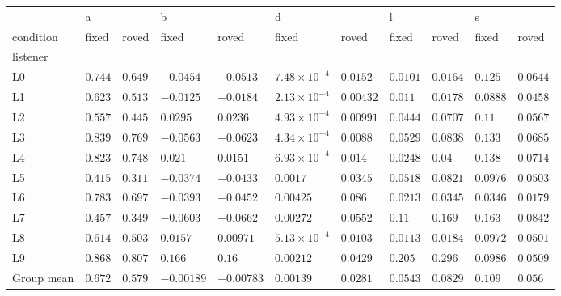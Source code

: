 \begin{tabular}{lllllllllll}
\toprule
{} & \multicolumn{2}{l}{a} & \multicolumn{2}{l}{b} & \multicolumn{2}{l}{d} & \multicolumn{2}{l}{l} & \multicolumn{2}{l}{s} \\
condition &    fixed &    roved &       fixed &       roved &                  fixed &      roved &     fixed &     roved &     fixed &     roved \\
listener   &          &          &             &             &                        &            &           &           &           &           \\
\midrule
L0         &  $0.744$ &  $0.649$ &   $-0.0454$ &   $-0.0513$ &  $7.48 \times 10^{-4}$ &   $0.0152$ &  $0.0101$ &  $0.0164$ &   $0.125$ &  $0.0644$ \\
L1         &  $0.623$ &  $0.513$ &   $-0.0125$ &   $-0.0184$ &  $2.13 \times 10^{-4}$ &  $0.00432$ &   $0.011$ &  $0.0178$ &  $0.0888$ &  $0.0458$ \\
L2         &  $0.557$ &  $0.445$ &    $0.0295$ &    $0.0236$ &  $4.93 \times 10^{-4}$ &  $0.00991$ &  $0.0444$ &  $0.0707$ &    $0.11$ &  $0.0567$ \\
L3         &  $0.839$ &  $0.769$ &   $-0.0563$ &   $-0.0623$ &  $4.34 \times 10^{-4}$ &   $0.0088$ &  $0.0529$ &  $0.0838$ &   $0.133$ &  $0.0685$ \\
L4         &  $0.823$ &  $0.748$ &     $0.021$ &    $0.0151$ &  $6.93 \times 10^{-4}$ &    $0.014$ &  $0.0248$ &    $0.04$ &   $0.138$ &  $0.0714$ \\
L5         &  $0.415$ &  $0.311$ &   $-0.0374$ &   $-0.0433$ &               $0.0017$ &   $0.0345$ &  $0.0518$ &  $0.0821$ &  $0.0976$ &  $0.0503$ \\
L6         &  $0.783$ &  $0.697$ &   $-0.0393$ &   $-0.0452$ &              $0.00425$ &    $0.086$ &  $0.0213$ &  $0.0345$ &  $0.0346$ &  $0.0179$ \\
L7         &  $0.457$ &  $0.349$ &   $-0.0603$ &   $-0.0662$ &              $0.00272$ &   $0.0552$ &    $0.11$ &   $0.169$ &   $0.163$ &  $0.0842$ \\
L8         &  $0.614$ &  $0.503$ &    $0.0157$ &   $0.00971$ &  $5.13 \times 10^{-4}$ &   $0.0103$ &  $0.0113$ &  $0.0184$ &  $0.0972$ &  $0.0501$ \\
L9         &  $0.868$ &  $0.807$ &     $0.166$ &      $0.16$ &              $0.00212$ &   $0.0429$ &   $0.205$ &   $0.296$ &  $0.0986$ &  $0.0509$ \\
Group mean &  $0.672$ &  $0.579$ &  $-0.00189$ &  $-0.00783$ &              $0.00139$ &   $0.0281$ &  $0.0543$ &  $0.0829$ &   $0.109$ &   $0.056$ \\
\bottomrule
\end{tabular}
